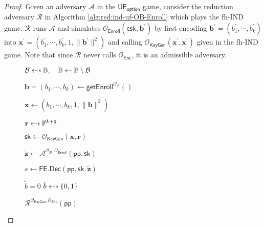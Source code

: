 \begin{proof}

Given an adversary $\mathcal{A}$ in the $\textsf{UF}_{\textsf{option}}$ game, consider the reduction adversary $\mathcal{R}$ in Algorithm \ref{alg:red:ind-uf-OB-Enroll} which plays the \textsf{fh-IND} game. $\mathcal{R}$ runs $\mathcal{A}$ and simulates $\mathcal{O}_{\textsf{Enroll}}( \textsf{esk}, \mathbf{b}^\prime )$ by first encoding $\mathbf{b}^\prime = (b_1^\prime, \cdots, b_k^\prime)$ into $\mathbf{x}^\prime = (b_1^\prime, \cdots, b_k^\prime, 1, \|\mathbf{b}^\prime\|^2)$ and calling $\mathcal{O}_{\textsf{KeyGen}}(\mathbf{x}^\prime, \mathbf{x}^\prime)$ given in the \textsf{fh-IND} game.  Note that since $\mathcal{R}$ never calls $\mathcal{O}_{\textsf{Enc}}$, it is an admissible adversary.

\begin{figure}[h]
\centering
	
	\begin{minipage}[t]{0.5\linewidth}
	\centering
	\begin{algorithm}[H]
	\caption{$\mathcal{R}^{\mathcal{O}_{\textsf{KeyGen}}, \mathcal{O}_{\textsf{Enc}}}(\textsf{pp})$}
	\label{alg:red:ind-uf-OB-Enroll}
	\begin{algorithmic}[1]
		\State $\mathcal{B} \getsdollar \mathbb{B}, \quad \mathbb{B} \gets \mathbb{B} \setminus \mathcal{B}$ \label{alg:red:ind-uf-OB-Enroll:B}

		\State $\mathbf{b} = (b_1, \cdots, b_k) \gets \textsf{getEnroll}^{\mathcal{O}_{\mathcal{B}}}()$

		\State $\mathbf{x} \gets (b_1, \cdots, b_k, 1, \|\mathbf{b}\|^2)$

		\State $\mathbf{r} \getsdollar \mathbb{F}^{k+2}$
		
		\State $\textsf{sk} \gets \mathcal{O}_{\textsf{KeyGen}}(\mathbf{x}, \mathbf{r})$ \label{alg:red:ind-uf-OB-Enroll:sk}

		\State ${\mathbf{\tilde{z}}} \gets {\mathcal{A}}^{\mathcal{O}_\mathcal{B}, \mathcal{O}_\textsf{Enroll} } ( \textsf{pp}, \textsf{sk} )$ \label{alg:red:ind-uf-OB-Enroll:A}

		\State $s \gets \textsf{FE.Dec}( \textsf{pp}, \textsf{sk}, \mathbf{\tilde{z}} )$

		 \label{alg:red:ind-uf-OB-Enroll:verify}
			\State \Return $\tilde{b} = 0$
		\Else
			\State \Return $\tilde{b} \getsdollar \{0, 1\}$
		\EndIf

	\end{algorithmic}
	\end{algorithm}
	\end{minipage}
	

\end{figure}
\end{proof}
